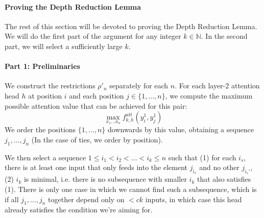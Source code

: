 \documentclass[11pt,a4paper]{article}
\begin{document}

\paragraph{Proving the Depth Reduction Lemma}
The rest of this section will be devoted to proving the Depth Reduction Lemma.
We will do the first part of the argument for any integer $k \in \mathbb{N}$.
In the second part, we will select a sufficiently large $k$.

\paragraph{Part 1: Preliminaries}


We construct the restrictions $\rho'_n$ separately for each $n$.
For each layer-2 attention head $h$ at position $i$ and each position $j \in \{1, ..., n\}$, we compute the maximum possible attention value that can be achieved for this pair:
\begin{equation}
\max_{x_1\dots x_n} f^{att}_{k,h}(y_i^{1}, y^{1}_j)
\end{equation}
We order the positions $\{1, ..., n\}$ downwards by this value, obtaining a sequence $j_1, ..., j_n$ (In the case of ties, we order by  position).

We then select a sequence $1 \leq i_1 < i_2 < ... < i_k \leq n$ such that (1) for each $i_s$, there is at least one input that only feeds into the element $j_{i_s}$ and no other $j_{i_s'}$, (2) $i_k$ is minimal, i.e. there is no subsequence with smaller $i_k$ that also satisfies (1).
There is only one case in which we cannot find such a subsequence, which is if all $j_1, ..., j_n$ together depend only on $< ck$ inputs, in which case this head already satisfies the condition we're aiming for.
\end{document}
